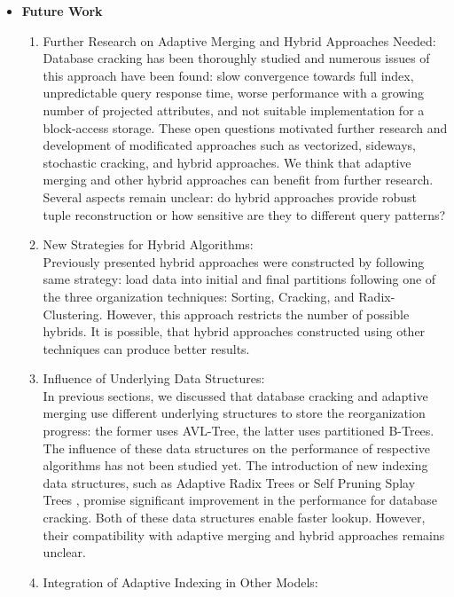 \documentclass[10pt, conference, compsocconf]{IEEEtran}
\begin{document}
\begin{itemize}
\begin{enumerate}
\end{enumerate}
\item{\textbf{Future Work}}
\begin{enumerate}
\item{Further Research on Adaptive Merging and Hybrid Approaches Needed:}\\
Database cracking has been thoroughly studied and numerous issues of this approach have been found: slow convergence towards full index, unpredictable query response time, worse performance with a growing number of projected attributes, and not suitable implementation for a block-access storage. These open questions motivated further research and development of modificated approaches such as vectorized, sideways, stochastic cracking, and hybrid approaches. We think that adaptive merging and other hybrid approaches can benefit from further research. Several aspects remain unclear: do hybrid approaches provide robust tuple reconstruction or how sensitive are they to different query patterns? \\
\item{New Strategies for Hybrid Algorithms:}\\
Previously presented hybrid approaches were constructed by following same strategy: load data into initial and final partitions following one of the three organization techniques: Sorting, Cracking, and Radix-Clustering. However, this approach restricts the number of possible hybrids. It is possible, that hybrid approaches constructed using other techniques can produce better results.\\
\item{Influence of Underlying Data Structures:}\\
In previous sections, we discussed that database cracking and adaptive merging use different underlying structures to store the reorganization progress: the former uses AVL-Tree, the latter uses partitioned B-Trees. The influence of these data structures on the performance of respective algorithms has not been studied yet. The introduction of new indexing data structures, such as Adaptive Radix Trees or Self Pruning Splay Trees \cite{spst}, promise significant improvement in the performance for database cracking. Both of these data structures enable faster lookup. However, their compatibility with adaptive merging and hybrid approaches remains unclear.\\
\item{Integration of Adaptive Indexing in Other Models:}\\

\end{enumerate}
\end{itemize}
\end{document}
